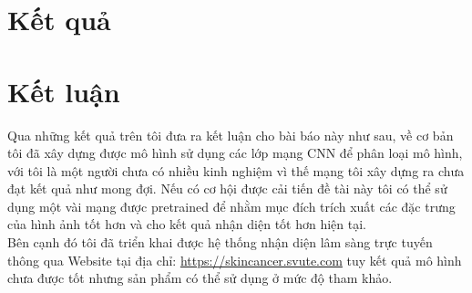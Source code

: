 \documentclass[12pt,a4paper]{article}
\begin{document}
	\section{Kết quả}
	
	
	\section{Kết luận}
	Qua những kết quả trên tôi đưa ra kết luận cho bài báo này như sau, về cơ bản tôi đã xây dựng được mô hình sử dụng các lớp mạng CNN để phân loại mô hình, với tôi là một người chưa có nhiều kinh nghiệm vì thế mạng tôi xây dựng ra chưa đạt kết quả như mong đợi. Nếu có cơ hội được cải tiến đề tài này tôi có thể sử dụng một vài mạng được pretrained để nhằm mục đích trích xuất các đặc trưng của hình ảnh tốt hơn và cho kết quả nhận diện tốt hơn hiện tại.\\
	
	\noindent
	Bên cạnh đó tôi đã triển khai được hệ thống nhận diện lâm sàng trực tuyến thông qua Website tại địa chỉ: \href{https://skincancer.svute.com}{https://skincancer.svute.com} tuy kết quả mô hình chưa được tốt nhưng sản phẩm có thể sử dụng ở mức độ tham khảo.
\end{document}
